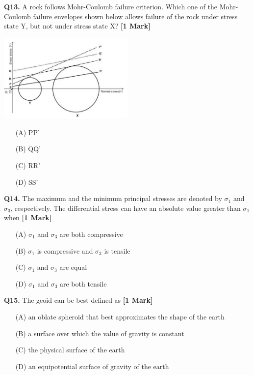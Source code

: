 \documentclass[11pt]{article}
\newcommand{\questiona}[2]{
    \noindent\textbf{Q#2.} #1 \hfill \textbf{[1 Mark]}
}
\begin{document}
\questiona{A rock follows Mohr-Coulomb failure criterion. Which one of the Mohr-Coulomb failure envelopes shown below allows failure of the rock under stress state Y, but not under stress state X?}{13}
\begin{center}
\includegraphics[width=0.5\textwidth]{figures/13}
\end{center}
\begin{enumerate}
    \item[(A)] PP’
    \item[(B)] QQ’
    \item[(C)] RR’
    \item[(D)] SS’
\end{enumerate}
\vspace{0.5cm}

\questiona{The maximum and the minimum principal stresses are denoted by \(\sigma_1\) and \(\sigma_3\), respectively. The differential stress can have an absolute value greater than \(\sigma_1\) when}{14}
\begin{enumerate}
    \item[(A)] \(\sigma_1\) and \(\sigma_3\) are both compressive
    \item[(B)] \(\sigma_1\) is compressive and \(\sigma_3\) is tensile
    \item[(C)] \(\sigma_1\) and \(\sigma_3\) are equal
    \item[(D)] \(\sigma_1\) and \(\sigma_3\) are both tensile
\end{enumerate}
\vspace{0.5cm}

\questiona{The geoid can be best defined as}{15}
\begin{enumerate}
    \item[(A)] an oblate spheroid that best approximates the shape of the earth
    \item[(B)] a surface over which the value of gravity is constant
    \item[(C)] the physical surface of the earth
    \item[(D)] an equipotential surface of gravity of the earth
\end{enumerate}
\vspace{0.5cm}
\end{document}
